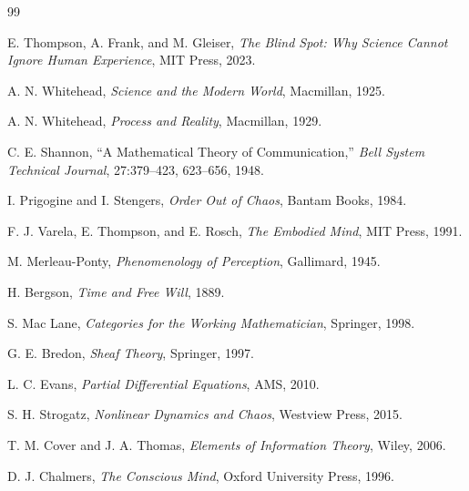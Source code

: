 \documentclass[11pt,openany]{book}
\begin{document}

\begin{thebibliography}{99}

E. Thompson, A. Frank, and M. Gleiser,
\textit{The Blind Spot: Why Science Cannot Ignore Human Experience},
MIT Press, 2023.

A. N. Whitehead,
\textit{Science and the Modern World},
Macmillan, 1925.

A. N. Whitehead,
\textit{Process and Reality},
Macmillan, 1929.

C. E. Shannon,
``A Mathematical Theory of Communication,''
\textit{Bell System Technical Journal}, 27:379--423, 623--656, 1948.

I. Prigogine and I. Stengers,
\textit{Order Out of Chaos},
Bantam Books, 1984.

F. J. Varela, E. Thompson, and E. Rosch,
\textit{The Embodied Mind},
MIT Press, 1991.

M. Merleau-Ponty,
\textit{Phenomenology of Perception},
Gallimard, 1945.

H. Bergson,
\textit{Time and Free Will},
1889.

S. Mac Lane,
\textit{Categories for the Working Mathematician},
Springer, 1998.

G. E. Bredon,
\textit{Sheaf Theory},
Springer, 1997.

L. C. Evans,
\textit{Partial Differential Equations},
AMS, 2010.

S. H. Strogatz,
\textit{Nonlinear Dynamics and Chaos},
Westview Press, 2015.

T. M. Cover and J. A. Thomas,
\textit{Elements of Information Theory},
Wiley, 2006.

D. J. Chalmers,
\textit{The Conscious Mind},
Oxford University Press, 1996.

\end{thebibliography}
\end{document}
